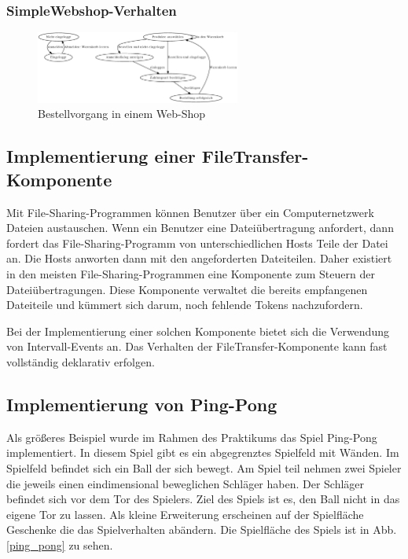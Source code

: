 \subsubsection{SimpleWebshop-Verhalten}

\begin{figure}[htp]
\begin{center}
  \includegraphics[width=0.6\textwidth]{graphics/webshop.dot.eps}
  \caption{Bestellvorgang in einem Web-Shop}
  \label{webshop_behaviour}
\end{center}
\end{figure}

\subsection{Implementierung einer FileTransfer-Komponente}
Mit File-Sharing-Programmen können Benutzer über ein Computernetzwerk
Dateien austauschen. Wenn ein Benutzer eine Dateiübertragung anfordert, dann
fordert das File-Sharing-Programm von unterschiedlichen Hosts Teile der Datei
an. Die Hosts anworten dann mit den angeforderten Dateiteilen. Daher existiert
in den meisten File-Sharing-Programmen eine Komponente zum Steuern der
Dateiübertragungen. Diese Komponente verwaltet die bereits empfangenen
Dateiteile und kümmert sich darum, noch fehlende Tokens nachzufordern.

Bei der Implementierung einer solchen Komponente bietet sich die Verwendung von
Intervall-Events an. Das Verhalten der FileTransfer-Komponente kann fast
vollständig deklarativ erfolgen. 

\subsection{Implementierung von Ping-Pong}
Als größeres Beispiel wurde im Rahmen des Praktikums das Spiel
Ping-Pong implementiert. In diesem Spiel gibt es ein abgegrenztes Spielfeld mit
Wänden. Im Spielfeld befindet sich ein Ball der sich bewegt. Am Spiel teil
nehmen zwei Spieler die jeweils einen eindimensional beweglichen Schläger haben.
Der Schläger befindet sich vor dem Tor des Spielers. Ziel des Spiels ist es, den
Ball nicht in das eigene Tor zu lassen. Als kleine Erweiterung erscheinen auf
der Spielfläche Geschenke die das Spielverhalten abändern. Die Spielfläche des
Spiels ist in Abb. \ref{ping_pong} zu sehen.

